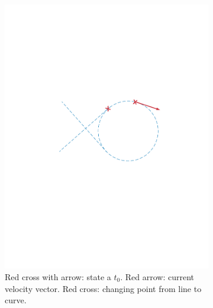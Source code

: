 \begin{itemize}
\begin{figure}[!htbp]
  \centering
   \begin{subfigure}[b]{0.45\textwidth}
        \includegraphics[width=\textwidth]{img/intersection_1.pdf}
        \caption{Red cross with arrow: state a $t_0$. Red arrow: current velocity vector. Red cross: changing point from line to curve.}
        \label{fig:one}
   \end{subfigure}\hfill
   \begin{subfigure}[b]{0.45\textwidth}

\end{subfigure}
\end{figure}
\end{itemize}
